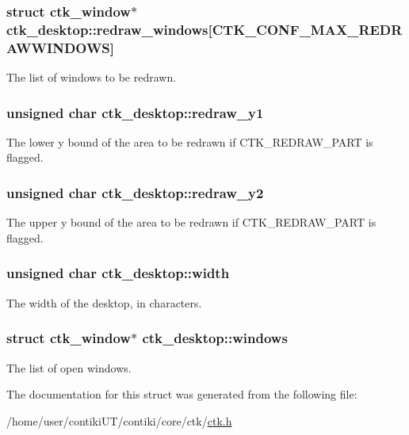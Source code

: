 \subsubsection[{redraw\+\_\+windows}]{\setlength{\rightskip}{0pt plus 5cm}struct {\bf ctk\+\_\+window}$\ast$ ctk\+\_\+desktop\+::redraw\+\_\+windows\mbox{[}C\+T\+K\+\_\+\+C\+O\+N\+F\+\_\+\+M\+A\+X\+\_\+\+R\+E\+D\+R\+A\+W\+W\+I\+N\+D\+O\+W\+S\mbox{]}}\label{structctk__desktop_a5d1ee2fbc501fb71c7690b91493b46c1}
The list of windows to be redrawn. \hypertarget{structctk__desktop_ae770b8567f0838de5ad83ce196b0a6ea}{}
\subsubsection[{redraw\+\_\+y1}]{\setlength{\rightskip}{0pt plus 5cm}unsigned char ctk\+\_\+desktop\+::redraw\+\_\+y1}\label{structctk__desktop_ae770b8567f0838de5ad83ce196b0a6ea}
The lower y bound of the area to be redrawn if C\+T\+K\+\_\+\+R\+E\+D\+R\+A\+W\+\_\+\+P\+A\+R\+T is flagged. \hypertarget{structctk__desktop_a870ac347ec560d19f9a0926c6bdf2b37}{}
\subsubsection[{redraw\+\_\+y2}]{\setlength{\rightskip}{0pt plus 5cm}unsigned char ctk\+\_\+desktop\+::redraw\+\_\+y2}\label{structctk__desktop_a870ac347ec560d19f9a0926c6bdf2b37}
The upper y bound of the area to be redrawn if C\+T\+K\+\_\+\+R\+E\+D\+R\+A\+W\+\_\+\+P\+A\+R\+T is flagged. \hypertarget{structctk__desktop_a7b6d5b276ee4defe23e90fd03088ac10}{}
\subsubsection[{width}]{\setlength{\rightskip}{0pt plus 5cm}unsigned char ctk\+\_\+desktop\+::width}\label{structctk__desktop_a7b6d5b276ee4defe23e90fd03088ac10}
The width of the desktop, in characters. \hypertarget{structctk__desktop_ab8349c5e65cb15988a848723dc5ec05f}{}
\subsubsection[{windows}]{\setlength{\rightskip}{0pt plus 5cm}struct {\bf ctk\+\_\+window}$\ast$ ctk\+\_\+desktop\+::windows}\label{structctk__desktop_ab8349c5e65cb15988a848723dc5ec05f}
The list of open windows. 

The documentation for this struct was generated from the following file\+:\begin{DoxyCompactItemize}
\item 
/home/user/contiki\+U\+T/contiki/core/ctk/\hyperlink{ctk_8h}{ctk.\+h}\end{DoxyCompactItemize}
